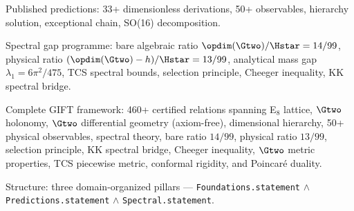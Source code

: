 \begin{theorem}\label{thm:predictions_cert}
    \leanok
    Published predictions: 33+ dimensionless derivations, 50+ observables,
    hierarchy solution, exceptional chain, SO(16) decomposition.
\end{theorem}

\begin{theorem}\label{thm:spectral_cert}
    \leanok
    Spectral gap programme: bare algebraic ratio $\opdim(\Gtwo)/\Hstar = 14/99$,
    physical ratio $({\opdim(\Gtwo) - h})/\Hstar = 13/99$,
    analytical mass gap $\lambda_1 = 6\pi^2/475$,
    TCS spectral bounds, selection principle, Cheeger inequality,
    KK spectral bridge.
\end{theorem}

\begin{theorem}\label{thm:grand_certificate}
    \leanok
    Complete GIFT framework: 460+ certified relations spanning
    E$_8$ lattice, $\Gtwo$ holonomy, $\Gtwo$ differential geometry (axiom-free),
    dimensional hierarchy, 50+ physical observables, spectral theory,
    bare ratio $14/99$, physical ratio $13/99$, selection principle, KK spectral bridge,
    Cheeger inequality, $\Gtwo$ metric properties,
    TCS piecewise metric, conformal rigidity, and Poincar\'e duality.

    Structure: three domain-organized pillars ---
    \texttt{Foundations.statement} $\wedge$
    \texttt{Predictions.statement} $\wedge$
    \texttt{Spectral.statement}.
\end{theorem}

